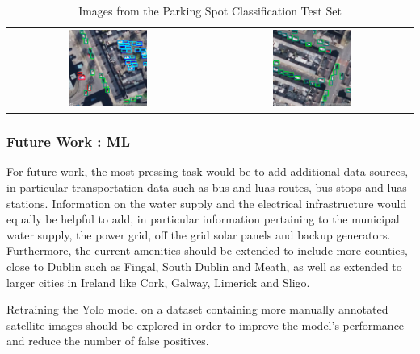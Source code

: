 \begin{table}[htbp]
\begin{tabular}{cc}
        \includegraphics[width=0.4\textwidth]{images/image5_classification_test_set.png} & \includegraphics[width=0.4\textwidth]{images/image6_classification_test_set.png} \\
    \end{tabular}
    \caption{Images from the Parking Spot Classification Test Set}
    \label{tab:test_images3}
\end{table}

\newpage{}

\subsubsection{Future Work : ML}

For future work, the most pressing task would be to add additional data sources, in particular transportation data such as bus and luas routes, bus stops and luas stations.
Information on the water supply and the electrical infrastructure would equally be helpful to add, in particular information pertaining to the municipal water supply, the power grid, off the grid solar panels and backup generators.
Furthermore, the current amenities should be extended to include more counties, close to Dublin such as Fingal, South Dublin and Meath, as well as extended to larger cities in Ireland like Cork, Galway, Limerick and Sligo.

Retraining the Yolo model on a dataset containing more manually annotated satellite images should be explored in order to improve the model's performance and reduce the number of false positives.

